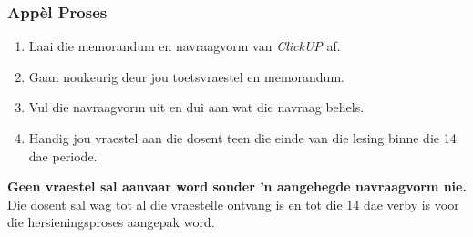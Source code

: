     \subsubsection{App\`{e}l Proses}
        \begin{enumerate}
            \item Laai die memorandum en navraagvorm van \textit{ClickUP} af.
            \item Gaan noukeurig deur jou toetsvraestel en memorandum.
            \item Vul die navraagvorm uit en dui aan wat die navraag behels.
            \item Handig jou vraestel aan die dosent teen die einde van die
                lesing binne die 14 dae periode.
        \end{enumerate}

        \textbf{Geen vraestel sal aanvaar word sonder 'n aangehegde navraagvorm
        nie.}  Die dosent sal wag tot al die vraestelle ontvang is en tot die
        14 dae verby is voor die hersieningsproses aangepak word.
